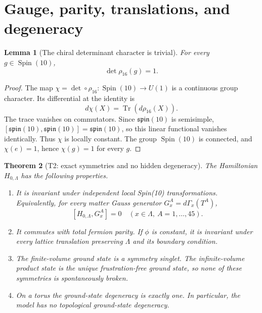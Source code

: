 \documentclass[11pt]{article}
\newtheorem{theorem}{Theorem}[section]
\newtheorem{lemma}[theorem]{Lemma}
\theoremstyle{remark}
\newcommand{\Tr}{\operatorname{Tr}}
\begin{document}
\section{Gauge, parity, translations, and degeneracy}

\begin{lemma}[The chiral determinant character is trivial]
\label{lem:det}
For every $g\in\operatorname{Spin}(10)$,
\[
 \det\rho_{16}(g)=1.
\tag{3.1}\label{eq:detone}
\]
\end{lemma}

\begin{proof}
The map $\chi=\det\circ\rho_{16}:
\operatorname{Spin}(10)\to U(1)$ is a continuous group character.
Its differential at the identity is
\[
 d\chi(X)=\Tr(d\rho_{16}(X)).
\]
The trace vanishes on commutators.  Since
$\mathfrak{spin}(10)$ is semisimple,
$[\mathfrak{spin}(10),\mathfrak{spin}(10)]
=\mathfrak{spin}(10)$, so this linear functional vanishes identically.
Thus $\chi$ is locally constant.  The group $\operatorname{Spin}(10)$
is connected, and $\chi(e)=1$, hence $\chi(g)=1$ for every $g$.
\end{proof}

\begin{theorem}[T2: exact symmetries and no hidden degeneracy]
\label{thm:T2}
The Hamiltonian $H_{0,\Lambda}$ has the following properties.
\begin{enumerate}[label=\textup{(\alph*)}]
\item It is invariant under independent local Spin(10) transformations.
Equivalently, for every matter Gauss generator
$G_x^A=d\Gamma_x(T^A)$,
\[
 [H_{0,\Lambda},G_x^A]=0
 \quad(x\in\Lambda,\ A=1,\ldots,45).
\tag{3.2}\label{eq:gauss}
\]
\item It commutes with total fermion parity.  If $\phi$ is constant,
it is invariant under every lattice translation preserving $\Lambda$
and its boundary condition.
\item The finite-volume ground state is a symmetry singlet.  The
infinite-volume product state is the unique frustration-free ground
state, so none of these symmetries is spontaneously broken.
\item On a torus the ground-state degeneracy is exactly one.  In
particular, the model has no topological ground-state degeneracy.
\end{enumerate}
\end{theorem}
\end{document}
